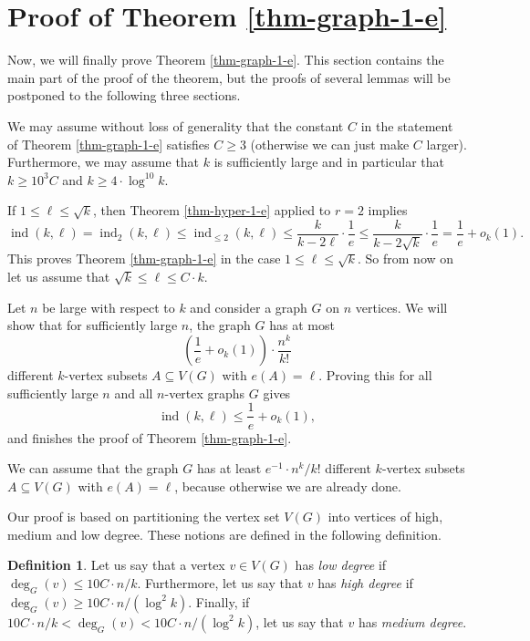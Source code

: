 \documentclass[11pt]{article}
\theoremstyle{definition}
\newtheorem{definition}[theorem]{Definition}
\numberwithin{equation}{section}
\begin{document}
\section{Proof of Theorem \ref{thm-graph-1-e}}\label{sect-proof-graph-1-e}

Now, we will finally prove Theorem \ref{thm-graph-1-e}. This section contains the main part of the proof of the theorem, but the proofs of several lemmas will be postponed to the following three sections.

We may assume without loss of generality that the constant $C$ in the statement of Theorem \ref{thm-graph-1-e} satisfies $C\geq 3$ (otherwise we can just make $C$ larger). Furthermore, we may assume that $k$ is sufficiently large and in particular that $k\geq 10^3 C$ and $k\geq 4\cdot \log^{10} k$.

If $1\leq \ell\leq \sqrt{k}$, then Theorem \ref{thm-hyper-1-e} applied to $r=2$ implies
\[\operatorname{ind}(k,\ell)=\operatorname{ind}_2(k,\ell)\leq \operatorname{ind}_{\leq 2}(k,\ell)\leq \frac{k}{k-2\ell}\cdot \frac{1}{e}\leq \frac{k}{k-2\sqrt{k}}\cdot \frac{1}{e}=\frac{1}{e}+o_k(1).\]
This proves Theorem \ref{thm-graph-1-e} in the case $1\leq \ell\leq \sqrt{k}$. So from now on let us assume that $\sqrt{k}\leq \ell\leq C\cdot k$.

Let $n$ be large with respect to $k$ and consider a graph $G$ on $n$ vertices. We will show that for sufficiently large $n$, the graph $G$ has at most
\[\left(\frac{1}{e}+o_k(1)\right)\cdot \frac{n^k}{k!}\]
different $k$-vertex subsets $A\subseteq V(G)$ with $e(A)=\ell$. Proving this for all sufficiently large $n$ and all $n$-vertex graphs $G$ gives
\[\operatorname{ind}(k,\ell)\leq \frac{1}{e}+o_k(1),\]
and finishes the proof of Theorem \ref{thm-graph-1-e}.

We can assume that the graph $G$ has at least $e^{-1}\cdot n^k/k!$ different $k$-vertex subsets $A\subseteq V(G)$ with $e(A)=\ell$, because otherwise we are already done.

Our proof is based on partitioning the vertex set $V(G)$ into vertices of high, medium and low degree. These notions are defined in the following definition.

\begin{definition}Let us say that a vertex $v\in V(G)$ has \emph{low degree} if $\deg_G(v)\leq 10C\cdot n/k$. Furthermore, let us say that $v$ has \emph{high degree} if $\deg_G(v)\geq 10C\cdot n/(\log^2 k)$. Finally, if $10C\cdot n/k<\deg_G(v)<10C\cdot n/(\log^2 k)$, let us say that $v$ has \emph{medium degree}.
\end{definition}
\end{document}

